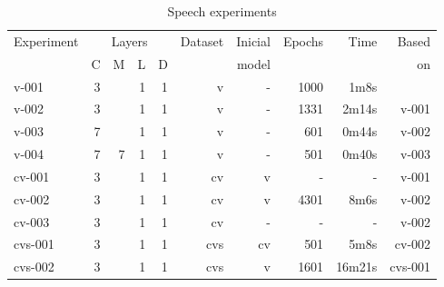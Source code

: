 \begin{table}[!ht]
    \centering
    \caption{Speech experiments}
    \label{tab:speechtimes}
\begin{tabular}{|l|r|r|r|r|r|r|r|r|r|}
\hline
Experiment & \multicolumn{4}{c|}{Layers}                     & Dataset & Inicial       & Epochs & Time   & Based    \\ \cline{2-5}
           & C                  & M          & L     & D     &         &         model &        &        &       on \\ \hline
v-001      &   3                &            &  1    &  1    & v       & -             & 1000   & 1m8s   &          \\ \hline
v-002      &   3                &            &  1    &  1    & v       & -             & 1331   & 2m14s  & v-001    \\ \hline
v-003      &   7                &            &  1    &  1    & v       & -             & 601    & 0m44s  & v-002    \\ \hline
v-004      &   7                & 7          &  1    &  1    & v       & -             & 501    & 0m40s  & v-003    \\ \hline
cv-001     &   3                &            &  1    &  1    & cv      & v             & -      & -      & v-001    \\ \hline
cv-002     &   3                &            &  1    &  1    & cv      & v             & 4301   & 8m6s   & v-002    \\ \hline
cv-003     &   3                &            &  1    &  1    & cv      & -             & -      & -      & v-002    \\ \hline
cvs-001    &   3                &            &  1    &  1    & cvs     & cv            & 501    & 5m8s   & cv-002   \\ \hline
cvs-002    &   3                &            &  1    &  1    & cvs     & v             & 1601   & 16m21s & cvs-001  \\ \hline
\end{tabular}
\end{table}


